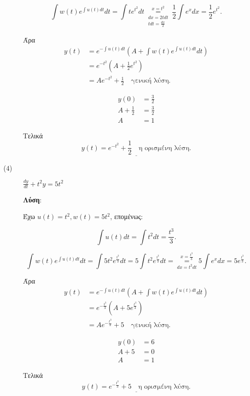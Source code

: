 \documentclass[a4paper,12pt]{article}
\begin{document}
\begin{description}
\[
\int w(t)e^{\int u(t)dt}dt = \int te^{t^2}dt \underset{\substack{dx=2tdt\\tdt=\frac{dx}{2}}}{\overset{x=t^2}{=}} \frac{1}{2}\int e^xdx = \frac{1}{2} e^{t^2}.
\]
\begin{minipage}{0.4\textwidth}
Άρα
\begin{align*}
y(t) &= e^{-\int u(t)dt}\left(A + \int w(t)e^{\int u(t)dt}dt\right) \\
&= e^{-t^2}(A+\frac{1}{2}e^{t^2}) \\
&= Ae^{-t^2}+\frac{1}{2} \quad\text{γενική λύση}.
\end{align*}
\end{minipage}\hfill\begin{minipage}{0.4\textwidth}
\begin{align*}
y(0) &= \frac{3}{2} \\
Α+ \frac{1}{2}&= \frac{3}{2} \\
A&=1
\end{align*}
\end{minipage}

Τελικά
\[
\underline{y(t) = e^{-t^2} + \frac{1}{2} \quad \text{η ορισμένη λύση.}}
\]

\vspace{\baselineskip}


\item [($4$)] $\boxed{\frac{dy}{dt} + t^2y = 5t^2}$

\textbf{Λύση}:

\vspace{\baselineskip}

Έχω $u(t)=t^2, w(t)=5t^2$, επομένως:

\[
\int u(t)dt = \int t^2dt = \frac{t^3}{3}.
\]

\[
\int w(t)e^{\int u(t)dt}dt = \int 5t^2e^{\frac{t^3}{3}}dt = 5\int t^2e^{\frac{t^3}{3}}dt = \underset{dx=t^2dt}{\overset{x=\frac{t^3}{3}}{=}} 5\int e^xdx = 5 e^{\frac{t^3}{3}}.
\]
\begin{minipage}{0.4\textwidth}
Άρα
\begin{align*}
y(t) &= e^{-\int u(t)dt}\left(A + \int w(t)e^{\int u(t)dt}dt\right) \\
&= e^{-\frac{t^3}{3}}(A+5e^{\frac{t^3}{3}}) \\
&= Ae^{-\frac{t^3}{3}}+5 \quad\text{γενική λύση}.
\end{align*}
\end{minipage}\hfill\begin{minipage}{0.4\textwidth}
\begin{align*}
y(0) &= 6 \\
Α+5 &= 0 \\
A&=1
\end{align*}
\end{minipage}

Τελικά
\[
\underline{y(t) = e^{-\frac{t^3}{3}}+5 \quad \text{η ορισμένη λύση.}}
\]


\end{description}
\end{document}
